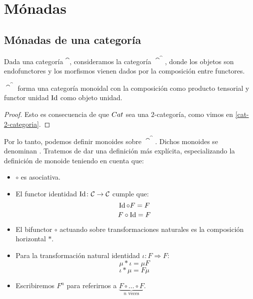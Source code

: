 \chapter{Mónadas}
\section{Mónadas de una categoría}
Dada una categoría $\cat$, consideramos la categoría $\cat^\cat$, donde los objetos son endofunctores y los morfismos vienen dados por la composición entre functores.

\begin{proposition}
$\cat^\cat$ forma una categoría monoidal con la composición como producto tensorial y functor unidad $\operatorname{Id}$ como objeto unidad.
\end{proposition}
\begin{proof}
Esto es consecuencia de que ${Cat}$ sea una $2$-categoría, como vimos en \ref{cat-2-categoria}.
\end{proof}

Por lo tanto, podemos definir monoides sobre $\cat^\cat$.
Dichos monoides se denominan .
Tratemos de dar una definición más explícita, especializando la definición de monoide teniendo en cuenta que:
\begin{itemize}
  \item $\circ$ es asociativa.
  \item El functor identidad $\operatorname{Id} \colon {\mathcal{C}} \to {\mathcal{C}}$ cumple que:
\[ \operatorname{Id} \circ F = F \]
\[ F \circ \operatorname{Id} = F\]
  \item El bifunctor $\circ$ actuando sobre transformaciones naturales es la composición horizontal $*$.
  \item Para la transformación natural identidad $\iota \colon F \Rightarrow F$:
\[ \mu * \iota = \mu F \]
\[ \iota * \mu = F \mu \]
  \item Escribiremos $F^n$ para referirnos a $\underbrace{F \circ \dots \circ F}_{n \text{ veces}}$.
\end{itemize}

